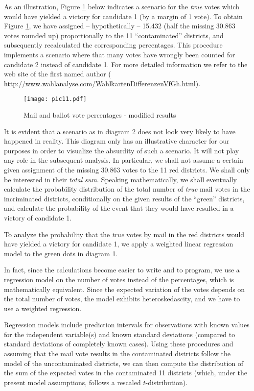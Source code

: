 \documentclass[12pt,a4paper]{article}
\theoremstyle{definition}
\begin{document}
As an illustration, Figure \ref{figure:diag2} below indicates a scenario for the {\it true} votes which would have yielded a victory for candidate 1 (by a margin of 1 vote).  To obtain Figure \ref{figure:diag2}, we have assigned  -- hypothetically -- 15.432 (half the missing 30.863 votes rounded up)  proportionally to the 11 ``contaminated'' districts, and subsequently recalculated the corresponding percentages. This procedure  implements a scenario where that many votes have wrongly been
counted for candidate 2 instead of candidate 1.
For more detailed information we refer to the web site of the first named author \cite{EN} (\url{ http://www.wahlanalyse.com/WahlkartenDifferenzenVfGh.html}).

\begin{figure}[h]
  \texttt{[image: pic11.pdf]}
  \caption{Mail and ballot vote percentages - modified results}
  \label{figure:diag2}
\end{figure}


It is evident that a scenario as in diagram 2 does not look very likely to have happened in reality. This diagram only has an illustrative character for our purposes in order to visualize the absurdity of such a scenario. It will not play any role in the subsequent analysis. In particular, we shall not assume a certain given assignment of the missing 30.863 votes to the 11 red districts. We shall only be interested in their {\it total sum}. Speaking mathematically, we shall eventually calculate the probability distribution of the total number of {\it true} mail votes in the incriminated districts, conditionally on the given results of the ``green'' districts, and calculate the probability of the event that they would have resulted in a victory of candidate 1.


To analyze the probability that the {\it true} votes by mail in the red districts would have yielded a victory for candidate 1, we apply a weighted linear regression model to the green dots in diagram 1.

In fact, since the calculations become easier to write and to program, we use a regression model on the number of votes
instead of the percentages, which is mathematically equivalent. Since the expected variation of the votes depends on the total number of votes,
the model exhibits heteroskedascity, and we have to use a weighted regression.


Regression models include prediction intervals for observations with known values for the independent variable(s) and known standard deviations (compared to standard deviations of completely known cases).
Using these procedures and assuming that the mail vote results in the contaminated districts follow the model of the uncontaminated districts, we can then compute the distribution of the sum of the expected
votes in the contaminated 11 districts (which, under the present model assumptions, follows a rescaled
$t$-distribution).
\end{document}
